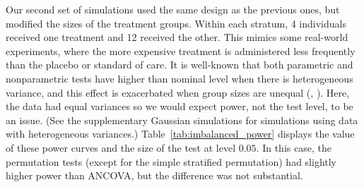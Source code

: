 \documentclass[12pt]{article}
\begin{document}
Our second set of simulations used the same design as the previous ones, but modified the sizes of the treatment groups.
Within each stratum, 4 individuals received one treatment and 12 received the other.
This mimics some real-world experiments, where the more expensive treatment is administered less frequently than the placebo or standard of care.
It is well-known that both parametric and nonparametric tests have higher than nominal level when there is heterogeneous variance, and this effect is exacerbated when group sizes are unequal (\cite{glass_consequences_1972}, \cite{zimmerman_two_2006}).
Here, the data had equal variances so we would expect power, not the test level, to be an issue.
(See the supplementary Gaussian simulations for simulations using data with heterogeneous variances.)
Table~\ref{tab:imbalanced_power} displays the value of these power curves and the size of the test at level $0.05$.
In this case, the permutation tests (except for the simple stratified permutation) had slightly higher power than ANCOVA, but the difference was not substantial.
%
\end{document}
